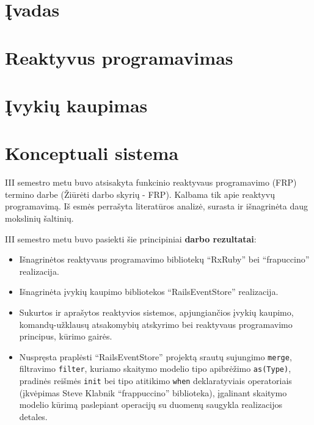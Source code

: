 \documentclass{VUMIFPSmagistrinis}
\begin{document}

\tableofcontents

\section{Įvadas}


\section{Reaktyvus programavimas}


\section{Įvykių kaupimas}


\section{Konceptuali sistema}



III semestro metu buvo atsisakyta funkcinio reaktyvaus programavimo (FRP) termino darbe (Žiūrėti darbo skyrių - FRP). Kalbama tik apie reaktyvų programavimą. Iš esmės perrašyta literatūros analizė, surasta ir išnagrinėta daug mokslinių šaltinių.

III semestro metu buvo pasiekti šie principiniai \textbf{darbo rezultatai}:

\begin{itemize}
  \item Išnagrinėtos reaktyvaus programavimo bibliotekų ``RxRuby'' bei ``frapuccino'' realizacija.
  \item Išnagrinėta įvykių kaupimo bibliotekos ``RailsEventStore'' realizacija.
  \item Sukurtos ir aprašytos reaktyvios sistemos, apjungiančios įvykių kaupimo, komandų-užklausų atsakomybių atskyrimo bei reaktyvaus programavimo principus, kūrimo gairės.
  \item Nuspręsta praplėsti ``RailsEventStore'' projektą srautų sujungimo \lstinline|merge|, filtravimo \lstinline|filter|, kuriamo skaitymo modelio tipo apibrėžimo \lstinline|as(Type)|, pradinės reišmės \lstinline|init| bei tipo atitikimo \lstinline|when| deklaratyviais operatoriais (įkvėpimas Steve Klabnik ``frappuccino'' biblioteka), įgalinant skaitymo modelio kūrimą paslepiant operacijų su duomenų saugykla realizacijos detales.
\end{itemize}
\end{document}
